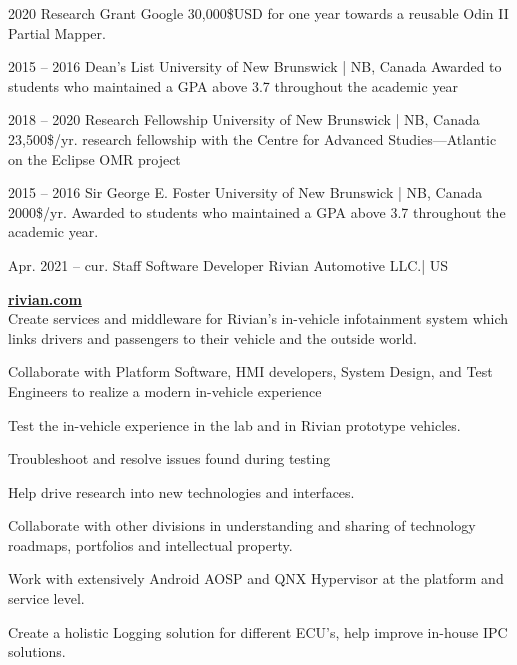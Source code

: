 \documentclass{developercv} %
\begin{document}

\entrys
{2020}
{Research Grant}
{Google}
{30,000\$USD for one year towards a reusable Odin II Partial Mapper.\footnotemark}


\entrys
{2015 -- 2016}
{Dean's List}
{University of New Brunswick | NB, Canada}
{Awarded to students who maintained a GPA above 3.7 throughout the academic year}


\entrys
{2018 -- 2020}
{Research Fellowship}
{University of New Brunswick | NB, Canada}
{23,500\$/yr. research fellowship  with the Centre for Advanced Studies---Atlantic on the Eclipse OMR project}

\entrys
{2015 -- 2016}
{Sir George E. Foster}
{University of New Brunswick | NB, Canada}
{2000\$/yr. Awarded to students who maintained a GPA above 3.7 throughout the academic year.}


\entrys
{Apr. 2021 -- cur.}
{Staff Software Developer}
{Rivian Automotive LLC.| US}{
	\textbf{\href{https://rivian.com/}{rivian.com}}\\
	Create services and middleware for Rivian’s in-vehicle infotainment system which links drivers and passengers to their vehicle and the outside world.
	\begin{tightemize}
		\item Collaborate with Platform Software, HMI developers, System Design, and Test Engineers to realize a modern in-vehicle experience
		\item Test the in-vehicle experience in the lab and in Rivian prototype vehicles.
		\item Troubleshoot and resolve issues found during testing
		\item Help drive research into new technologies and interfaces.
		\item Collaborate with other divisions in understanding and sharing of technology roadmaps, portfolios and intellectual property.
		\item Work with extensively Android AOSP and QNX Hypervisor at the platform and service level.
		\item Create a holistic Logging solution for different ECU's, help improve in-house IPC solutions.
	\end{tightemize}

}
\end{document}
